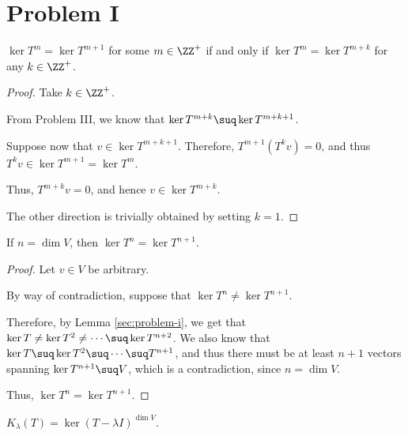 \documentclass[11pt]{scrartcl}
\begin{document}
\section{Problem I}
\begin{lemma}
  \label{sec:problem-i}
  $\ker T^m = \ker T^{m+1}$ for some $m\in\ZZ^+$ if and only if
  $\ker T^m=\ker T^{m+k}$ for any $k\in\ZZ^+$.
\end{lemma}
\begin{proof}
  \hfill

  Take $k\in \ZZ^+$.

  From Problem III, we know that $\ker T^{m+k}\suq \ker T^{m+k+1}$.

  Suppose now that $v\in \ker T^{m+k+1}$. Therefore,
  $T^{m+1}(T^kv) =0$, and thus $T^kv\in \ker T^{m+1} = \ker T^m$.

  Thus, $T^{m+k}v = 0$, and hence $v\in\ker T^{m+k}$.

  The other direction is trivially obtained by setting $k=1$.
\end{proof}

\begin{lemma}
  \label{sec:problem-i-1}
  If $n=\dim V$, then $\ker T^n=\ker T^{n+1}$.
\end{lemma}
\begin{proof}
  \hfill

  Let $v\in V$ be arbitrary.
  

  By way of contradiction, suppose that  $\ker T^n\neq \ker T^{n+1}$.

  Therefore, by Lemma \ref{sec:problem-i}, we get that $\ker T\neq \ker T^2\neq \cdots \suq \ker T^{n+2}$. We also know that $\ker T\suq \ker T^2\suq \cdots\suq T^{n+1}$, and thus there must be at least $n+1$ vectors spanning $\ker T^{n+1}\suq V$, which is a contradiction, since $n = \dim V$.

  Thus, $\ker T^n = \ker T^{n+1}$.
\end{proof}

\begin{lemma}
  \label{sec:problem-i-2}
 $K_{\lambda}(T)= \ker(T-\lambda I)^{\dim V}$.
\end{lemma}
\end{document}
